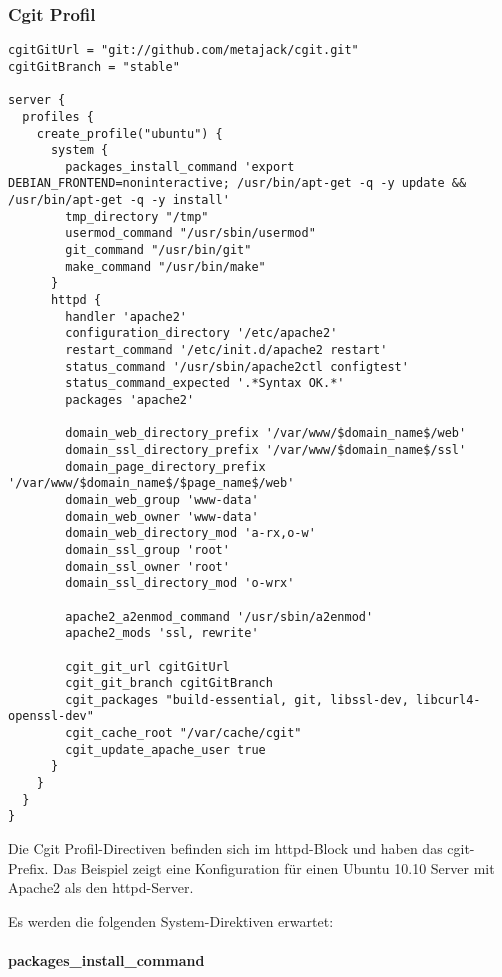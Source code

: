 \subsubsection{Cgit Profil}

\begin{lstlisting}[style=Java, caption=Beispiel Cgit Profil]
cgitGitUrl = "git://github.com/metajack/cgit.git"
cgitGitBranch = "stable"

server {
  profiles {
    create_profile("ubuntu") {
      system {
        packages_install_command 'export DEBIAN_FRONTEND=noninteractive; /usr/bin/apt-get -q -y update && /usr/bin/apt-get -q -y install'
        tmp_directory "/tmp"
        usermod_command "/usr/sbin/usermod"
        git_command "/usr/bin/git"
        make_command "/usr/bin/make"
      }
      httpd {
        handler 'apache2'
        configuration_directory '/etc/apache2'
        restart_command '/etc/init.d/apache2 restart'
        status_command '/usr/sbin/apache2ctl configtest'
        status_command_expected '.*Syntax OK.*'
        packages 'apache2'

        domain_web_directory_prefix '/var/www/$domain_name$/web'
        domain_ssl_directory_prefix '/var/www/$domain_name$/ssl'
        domain_page_directory_prefix '/var/www/$domain_name$/$page_name$/web'
        domain_web_group 'www-data'
        domain_web_owner 'www-data'
        domain_web_directory_mod 'a-rx,o-w'
        domain_ssl_group 'root'
        domain_ssl_owner 'root'
        domain_ssl_directory_mod 'o-wrx'

        apache2_a2enmod_command '/usr/sbin/a2enmod'
        apache2_mods 'ssl, rewrite'

        cgit_git_url cgitGitUrl
        cgit_git_branch cgitGitBranch
        cgit_packages "build-essential, git, libssl-dev, libcurl4-openssl-dev"
        cgit_cache_root "/var/cache/cgit"
        cgit_update_apache_user true
      }
    }
  }
}
\end{lstlisting}

Die Cgit Profil-Directiven befinden sich im httpd-Block und haben das
cgit-Prefix. Das Beispiel zeigt eine Konfiguration für einen Ubuntu 10.10 Server
mit Apache2 als den httpd-Server.

Es werden die folgenden System-Direktiven erwartet:

\paragraph{packages\_install\_command}

